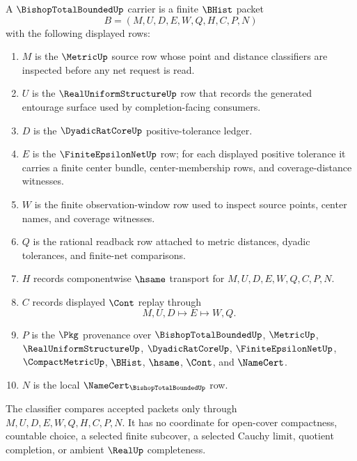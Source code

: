 \begin{definition}
\label{def:bishop-total-bounded-carrier}
A $\BishopTotalBoundedUp$ carrier is a finite $\BHist$ packet
$$
B=(M,U,D,E,W,Q,H,C,P,N)
$$
with the following displayed rows:
\begin{enumerate}
\item $M$ is the $\MetricUp$ source row whose point and distance classifiers are inspected before any net request is read.
\item $U$ is the $\RealUniformStructureUp$ row that records the generated entourage surface used by completion-facing consumers.
\item $D$ is the $\DyadicRatCoreUp$ positive-tolerance ledger.
\item $E$ is the $\FiniteEpsilonNetUp$ row; for each displayed positive tolerance it carries a finite center bundle, center-membership rows, and coverage-distance witnesses.
\item $W$ is the finite observation-window row used to inspect source points, center names, and coverage witnesses.
\item $Q$ is the rational readback row attached to metric distances, dyadic tolerances, and finite-net comparisons.
\item $H$ records componentwise $\hsame$ transport for $M,U,D,E,W,Q,C,P,N$.
\item $C$ records displayed $\Cont$ replay through
$$
M,U,D \longmapsto E \longmapsto W,Q .
$$
\item $P$ is the $\Pkg$ provenance over $\BishopTotalBoundedUp$, $\MetricUp$, $\RealUniformStructureUp$, $\DyadicRatCoreUp$, $\FiniteEpsilonNetUp$, $\CompactMetricUp$, $\BHist$, $\hsame$, $\Cont$, and $\NameCert$.
\item $N$ is the local $\NameCert_{\BishopTotalBoundedUp}$ row.
\end{enumerate}
The classifier compares accepted packets only through $M,U,D,E,W,Q,H,C,P,N$. It has no coordinate for open-cover compactness, countable choice, a selected finite subcover, a selected Cauchy limit, quotient completion, or ambient $\RealUp$ completeness.
\end{definition}

